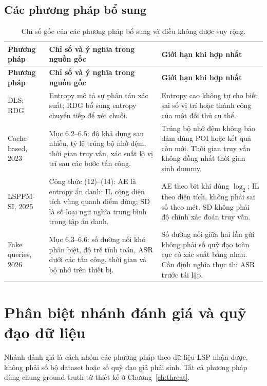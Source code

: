 \documentclass[12pt,a4paper,oneside]{report}
\begin{document}
\subsection{Các phương pháp bổ sung}

\begingroup\small{}
\begin{longtable}{P{3.0cm}P{6.1cm}P{5.25cm}}
\caption{Chỉ số gốc của các phương pháp bổ sung và điều không được suy rộng.}
\label{tab:additional-metrics}\\
\toprule
\textbf{Phương pháp} & \textbf{Chỉ số và ý nghĩa trong nguồn gốc} & \textbf{Giới hạn khi hợp nhất}\\
\midrule\endfirsthead
\toprule\textbf{Phương pháp} & \textbf{Chỉ số và ý nghĩa trong nguồn gốc} & \textbf{Giới hạn khi hợp nhất}\\
\midrule\endhead\bottomrule\endfoot
DLS; RDG~\citep{niu2014dls,shaham2021viterbi}
& Entropy mô tả sự phân tán xác suất; RDG bổ sung entropy chuyển tiếp để xét chuỗi.
& Entropy cao không tự cho biết sai số vị trí hoặc thành công của một đối thủ cụ thể.\\
\midrule
Cache-based, 2023~\citep{liu2023cache}
& Mục 6.2--6.5: độ khả dụng sau nhiễu, tỷ lệ trúng bộ nhớ đệm, thời gian truy vấn, xác suất lộ vị trí sau các bước tấn công.
& Trúng bộ nhớ đệm không bảo đảm đúng POI hoặc kết quả còn mới. Thời gian truy vấn không đồng nhất thời gian sinh dummy.\\
\midrule
LSPPM-SI, 2025~\citep{kuang2025lsppm}
& Công thức (12)--(14): AE là entropy ẩn danh; IL cộng diện tích vùng quanh điểm dừng; SD là số loại ngữ nghĩa trung bình trong tập ẩn danh.
& AE theo bit khi dùng $\log_2$; IL theo diện tích, không phải sai số theo mét. SD không phải độ chính xác đoán truy vấn.\\
\midrule
Fake queries, 2026~\citep{liu2026fakequeries}
& Mục 6.3--6.6: số đường nối khó phân biệt, độ trễ tính toán, ASR dưới các tấn công, thời gian và bộ nhớ trên thiết bị.
& Số đường nối giữa hai lần gửi không phải số quỹ đạo toàn cục có xác suất bằng nhau. Cần định nghĩa thực thi ASR trước tái lập.\\
\end{longtable}
\endgroup

\section{Phân biệt nhánh đánh giá và quỹ đạo dữ liệu}

Nhánh đánh giá là cách nhóm các phương pháp theo dữ liệu LSP nhận được, không phải số bộ dataset hoặc số quỹ đạo giả phải sinh. Tất cả phương pháp dùng chung ground truth từ thiết kế ở Chương~\ref{ch:threat}.
\end{document}
